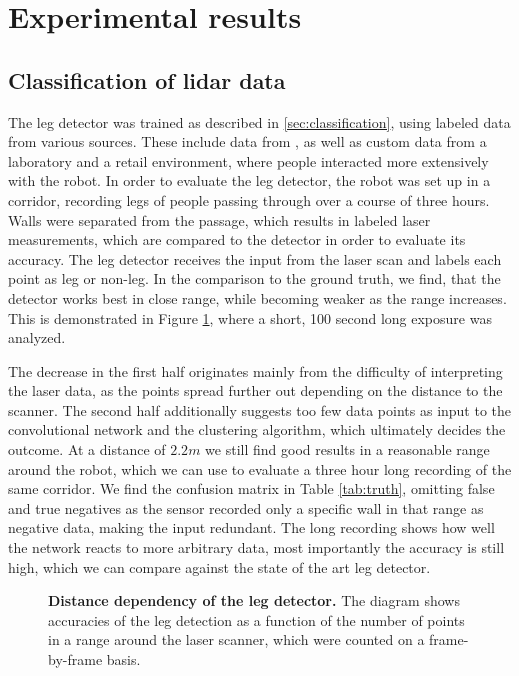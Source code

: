 \section{Experimental results}
\label{sec:Experiment}

\subsection{Classification of lidar data}

The leg detector was trained as described in \ref{sec:classification}, using labeled data from various sources. These include data from \cite{Arras07usingboosted}, \cite{weinrich2014people} as well as custom data from a laboratory and a retail environment, where people interacted more extensively with the robot.
In order to evaluate the leg detector, the robot was set up in a corridor, recording legs of people passing through over a course of three hours. Walls were separated from the passage, which results in labeled laser measurements, which are compared to the detector in order to evaluate its accuracy. The leg detector receives the input from the laser scan and labels each point as leg or non-leg.
In the comparison to the ground truth, we find, that the detector works best in close range, while becoming weaker as the range increases. This is demonstrated in Figure \ref{fig:radius_detection}, where a short, 100 second long exposure was analyzed.

The decrease in the first half originates mainly from the difficulty of interpreting the laser data, as the points spread further out depending on the distance to the scanner. The second half additionally suggests too few data points as input to the convolutional network and the clustering algorithm, which ultimately decides the outcome.
At a distance of $2.2 m$ we still find good results in a reasonable range around the robot, which we can use to evaluate a three hour long recording of the same corridor. We find the confusion matrix in Table \ref{tab:truth}, omitting false and true negatives as the sensor recorded only a specific wall in that range as negative data, making the input redundant. The long recording shows how well the network reacts to more arbitrary data, most importantly the accuracy is still high, which we can compare against the state of the art leg detector.

\begin{figure}[]
	\normalsize
	\begin{center}
		
	\end{center}
	\caption{\textbf{Distance dependency of the leg detector.} The diagram shows accuracies of the leg detection as a function of the number of points in a range around the laser scanner, which were counted on a frame-by-frame basis.}
	\label{fig:radius_detection}
\end{figure}

